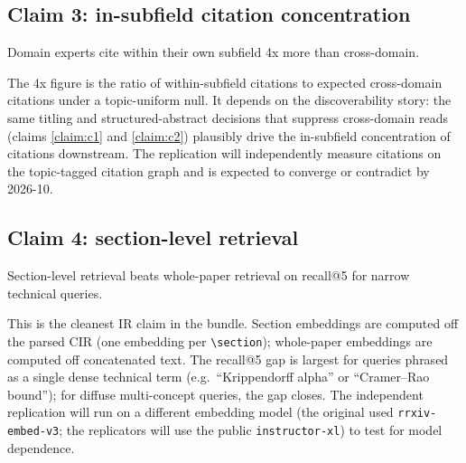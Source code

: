 \documentclass{rrxiv}
\begin{document}
\subsection*{Claim 3: in-subfield citation concentration}
\begin{claim}[type=empirical, evidence=observation, confidence=0.55, rationale={Ratio against a topic-uniform null on the demonstration citation graph; sensitive to the null model choice}, labels={worked-example, citation-graph}, title={In-subfield citation concentration}]
\label{claim:c3}
Domain experts cite within their own subfield 4x more than cross-domain.
\end{claim}

The 4x figure is the ratio of within-subfield citations to expected cross-domain citations under a topic-uniform null. It depends on the discoverability story: the same titling and structured-abstract decisions that suppress cross-domain reads (claims \ref{claim:c1} and \ref{claim:c2}) plausibly drive the in-subfield concentration of citations downstream. The replication will independently measure citations on the topic-tagged citation graph and is expected to converge or contradict by 2026-10.

\subsection*{Claim 4: section-level retrieval}
\begin{claim}[type=computational, evidence=experiment, confidence=0.7, rationale={Cleanest IR benchmark in the bundle, but run on one embedding model; the registered replication tests model dependence}, labels={worked-example, retrieval}, title={Section-level retrieval}]
\label{claim:c4}
Section-level retrieval beats whole-paper retrieval on recall@5 for narrow technical queries.
\end{claim}

This is the cleanest IR claim in the bundle. Section embeddings are computed off the parsed CIR (one embedding per \texttt{\textbackslash section}); whole-paper embeddings are computed off concatenated text. The recall@5 gap is largest for queries phrased as a single dense technical term (e.g.\ ``Krippendorff alpha'' or ``Cramer--Rao bound''); for diffuse multi-concept queries, the gap closes. The independent replication will run on a different embedding model (the original used \texttt{rrxiv-embed-v3}; the replicators will use the public \texttt{instructor-xl}) to test for model dependence.
\end{document}
